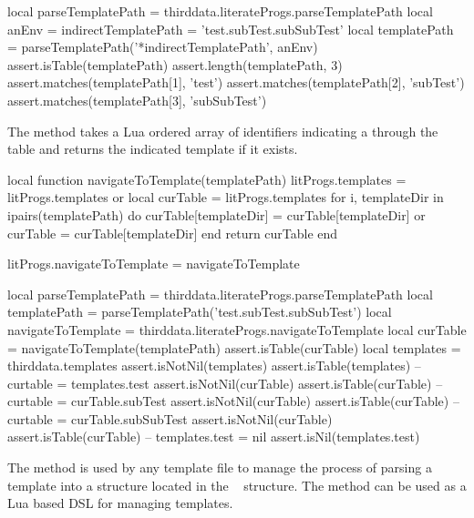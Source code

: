 {{

\startLuaTest
local parseTemplatePath = thirddata.literateProgs.parseTemplatePath
local anEnv = {
  indirectTemplatePath = 'test.subTest.subSubTest'
}
local templatePath = parseTemplatePath('*indirectTemplatePath', anEnv)
assert.isTable(templatePath)
assert.length(templatePath, 3)
assert.matches(templatePath[1], 'test')
assert.matches(templatePath[2], 'subTest')
assert.matches(templatePath[3], 'subSubTest')
\stopLuaTest
\stopTestCase
\stopTestSuite

\startTestSuite[navigateToTemplate]

The  method takes a Lua ordered array of 
identifiers indicating a  through the 
 table and returns the indicated 
template if it exists. 

\startLuaCode
local function navigateToTemplate(templatePath)
  litProgs.templates = litProgs.templates or { }
  local curTable = litProgs.templates
  for i, templateDir in ipairs(templatePath) do
    curTable[templateDir] = curTable[templateDir] or { }
    curTable = curTable[templateDir]
  end
  return curTable
end

litProgs.navigateToTemplate = navigateToTemplate
\stopLuaCode

\startLuaTest
local parseTemplatePath = thirddata.literateProgs.parseTemplatePath
local templatePath = parseTemplatePath('test.subTest.subSubTest')
local navigateToTemplate = thirddata.literateProgs.navigateToTemplate
local curTable = navigateToTemplate(templatePath)
assert.isTable(curTable)
local templates = thirddata.templates
assert.isNotNil(templates)
assert.isTable(templates)
--
curtable = templates.test
assert.isNotNil(curTable)
assert.isTable(curTable)
--
curtable = curTable.subTest
assert.isNotNil(curTable)
assert.isTable(curTable)
--
curtable = curTable.subSubTest
assert.isNotNil(curTable)
assert.isTable(curTable)
--
templates.test = nil
assert.isNil(templates.test)
\stopLuaTest
\stopTestCase
\stopTestSuite

\startTestSuite[addTemplate]

The  method is used by any template file to manage the 
process of parsing a template into a structure located in the \ConTeXt\ 
 structure. The  
method can be used as a Lua based DSL for managing templates. 

}}
